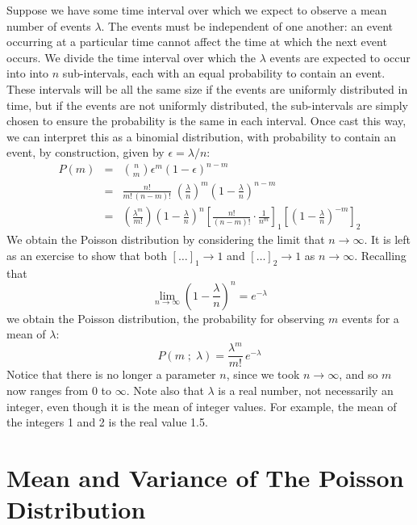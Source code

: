 \documentclass[12pt,oneside]{book}
\begin{document}
Suppose we have some time interval over which we expect to observe a mean number of events $\lambda$.  The events must be independent of one another:  an event occurring at a particular time cannot affect the time at which the next event occurs.  We divide the time interval over which the $\lambda$ events are expected to occur into into $n$ sub-intervals, each with an equal probability to contain an event.  These intervals will be all the same size if the events are uniformly distributed in time, but if the events are not uniformly distributed, the sub-intervals are simply chosen to ensure the probability is the same in each interval.  Once cast this way, we can interpret this as a binomial distribution, with probability to contain an event, by construction, given by $\epsilon = \lambda / n$:
\begin{eqnarray*}
P(m) &=& \binom{n}{m} \epsilon^m (1-\epsilon)^{n-m} \\[5pt]
  &=& \frac{n!}{m! \, (n-m)!} \; \left( \frac{\lambda}{n} \right)^m \left( 1 - \frac{\lambda}{n}\right)^{n-m} \\[5pt]
  &=& \left( \frac{\lambda^m}{m!} \right) \left(1-\frac{\lambda}{n} \right)^n \left[ \frac{n!}{(n-m)!} \cdot \frac{1}{n^m}\right]_1 \left[ \left( 1 - \frac{\lambda}{n}\right)^{-m}\right]_2
\end{eqnarray*}
We obtain the Poisson distribution by considering the limit that  $n \to \infty$.   It is left as an exercise to show that both $[\dots]_1 \to 1$ and $[\dots]_2 \to 1$ as $n \to \infty$.  Recalling that
\begin{displaymath}
\lim_{n \to \infty} \left(1 - \frac{\lambda}{n} \right)^n = e^{-\lambda}
\end{displaymath}
we obtain the Poisson distribution, the probability for observing $m$ events for a mean of $\lambda$:
\begin{equation}
\label{eqn:poisson}
P(m\; ; \; \lambda) = \frac{\lambda^m}{m!} \, e^{-\lambda}
\end{equation}
Notice that there is no longer a parameter $n$, since we took $n \to \infty$, and so $m$ now ranges from 0 to $\infty$.  Note also that $\lambda$ is a real number, not necessarily an integer, even though it is the mean of integer values.  For example, the mean of the integers 1 and 2 is the real value 1.5.

\section{Mean and Variance of The Poisson Distribution}
\end{document}
